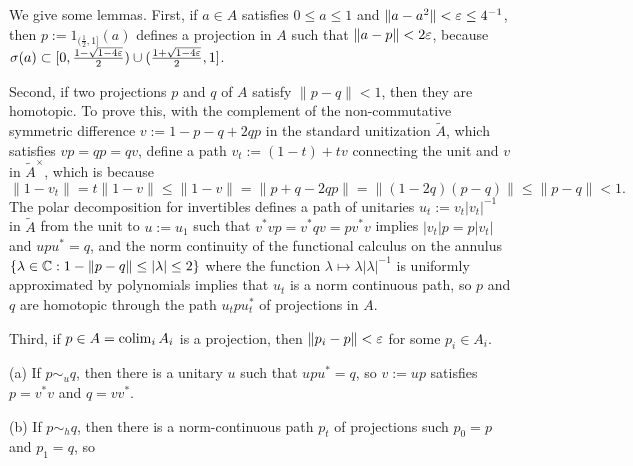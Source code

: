 \documentclass{../../large}
\begin{document}
\begin{pf}

We give some lemmas.
First, if $a\in A$ satisfies $0\le a\le1$ and $\|a-a^2\|<\varepsilon\le4^{-1}$, then $p:=1_{(\frac12,1]}(a)$ defines a projection in $A$ such that $\|a-p\|<2\varepsilon$, because $\sigma(a)\subset[0,\frac{1-\sqrt{1-4\varepsilon}}2)\cup(\frac{1+\sqrt{1-4\varepsilon}}2,1]$.

Second, if two projections $p$ and $q$ of $A$ satisfy $\|p-q\|<1$, then they are homotopic.
To prove this, with the complement of the non-commutative symmetric difference $v:=1-p-q+2qp$ in the standard unitization $\tilde A$, which satisfies $vp=qp=qv$, define a path $v_t:=(1-t)+tv$ connecting the unit and $v$ in $\tilde A^\times$, which is because
\[\|1-v_t\|=t\|1-v\|\le\|1-v\|=\|p+q-2qp\|=\|(1-2q)(p-q)\|\le\|p-q\|<1.\]
The polar decomposition for invertibles defines a path of unitaries $u_t:=v_t|v_t|^{-1}$ in $\tilde A$ from the unit to $u:=u_1$ such that $v^*vp=v^*qv=pv^*v$ implies $|v_t|p=p|v_t|$ and $upu^*=q$, and the norm continuity of the functional calculus on the annulus $\{\lambda\in\mathbb{C}:1-\|p-q\|\le|\lambda|\le2\}$ where the function $\lambda\mapsto\lambda|\lambda|^{-1}$ is uniformly approximated by polynomials implies that $u_t$ is a norm continuous path, so $p$ and $q$ are homotopic through the path $u_tpu_t^*$ of projections in $A$.


Third, if $p\in A=\operatorname*{colim}_i A_i$ is a projection, then $\|p_i-p\|<\varepsilon$ for some $p_i\in A_i$.



(a)
If $p\sim_u q$, then there is a unitary $u$ such that $upu^*=q$, so $v:=up$ satisfies $p=v^*v$ and $q=vv^*$.


(b)
If $p\sim_h q$, then there is a norm-continuous path $p_t$ of projections such $p_0=p$ and $p_1=q$, so 

\end{pf}
\end{document}
